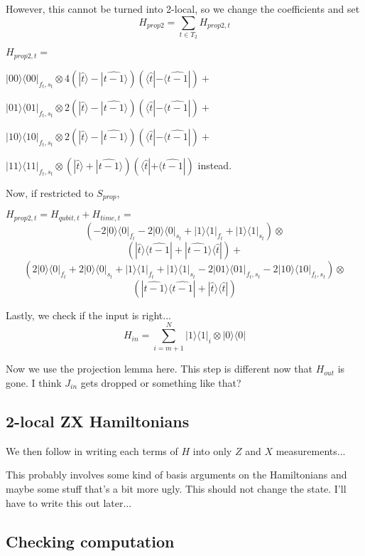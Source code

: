 \documentclass{article}
\theoremstyle{definition}
\begin{document}
However, this cannot be turned into 2-local, so we change the coefficients and set 
	$$H_{prop2}=\sum_{t\in T_2}H_{prop2,t}$$

	$H_{prop2,t}=$

	$|00\rangle\langle00|_{f_t,s_t}\otimes
		4(|\widehat{t}\rangle-|\widehat{t-1}\rangle)
		(\langle\widehat{t}|-\langle\widehat{t-1}|)+$

	$|01\rangle\langle01|_{f_t,s_t}\otimes
		2(|\widehat{t}\rangle-|\widehat{t-1}\rangle)
		(\langle\widehat{t}|-\langle\widehat{t-1}|)+$

	$|10\rangle\langle10|_{f_t,s_t}\otimes
		2(|\widehat{t}\rangle-|\widehat{t-1}\rangle)
		(\langle\widehat{t}|-\langle\widehat{t-1}|)+$

	$|11\rangle\langle11|_{f_t,s_t}\otimes
		(|\widehat{t}\rangle+|\widehat{t-1}\rangle)
		(\langle\widehat{t}|+\langle\widehat{t-1}|)$
instead.

Now, if restricted to $S_{prop}$,

	$H_{prop2,t}=H_{qubit,t}+H_{time,t}=$
	$$(-2|0\rangle\langle0|_{f_t}-2|0\rangle\langle0|_{s_t}
		+|1\rangle\langle1|_{f_t}+|1\rangle\langle1|_{s_t})\otimes$$
	$$(|\widehat{t}\rangle\langle\widehat{t-1}|+
		|\widehat{t-1}\rangle\langle\widehat{t}|)+$$
	$$(2|0\rangle\langle0|_{f_t}+2|0\rangle\langle0|_{s_t}
		+|1\rangle\langle1|_{f_t}+|1\rangle\langle1|_{s_t}
		-2|01\rangle\langle01|_{f_t,s_t}
		-2|10\rangle\langle10|_{f_t,s_t})\otimes$$
	$$(|\widehat{t-1}\rangle\langle\widehat{t-1}|+
		|\widehat{t}\rangle\langle\widehat{t}|)$$


Lastly, we check if the input is right...
	$$H_{in}=\sum_{i=m+1}^N|1\rangle\langle1|_i\otimes|0\rangle\langle0|$$

Now we use the projection lemma here. This step is different now that $H_{out}$ is gone. I think $J_{in}$ gets dropped or something like that?

\subsection{2-local ZX Hamiltonians}

We then follow \cite{0704.1287} in writing each terms of $H$ into only $Z$ and $X$ measurements...

This probably involves some kind of basis arguments on the Hamiltonians and maybe some stuff that's a bit more ugly. This should not change the state. I'll have to write this out later...

\subsection{Checking computation}
\end{document}
